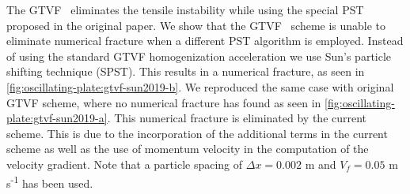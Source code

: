The GTVF~\citep{zhang_hu_adams17} eliminates the tensile instability while
using the special PST proposed in the original paper. We show that the
GTVF~\citep{zhang_hu_adams17} scheme is unable to eliminate numerical fracture
when a different PST algorithm is employed. Instead of using
the standard GTVF homogenization acceleration we use Sun's particle shifting
technique (SPST). This results in a numerical fracture, as seen in
\cref{fig:oscillating-plate:gtvf-sun2019-b}. We reproduced the same case with
original GTVF scheme, where no numerical fracture has found as seen in
\cref{fig:oscillating-plate:gtvf-sun2019-a}. This numerical fracture is
eliminated by the current scheme. This is due to the incorporation of the
additional terms in the current scheme as well as the use of momentum velocity
in the computation of the velocity gradient. Note that a particle spacing of
$\Delta x=0.002$ m and $V_f=0.05$ m\,s\textsuperscript{-1} has been used.

